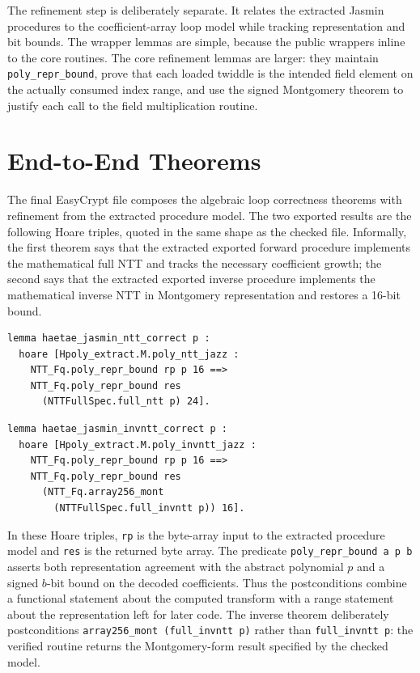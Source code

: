 \documentclass[10pt,twocolumn]{article}
\newcommand{\jasmin}{Jasmin}
\begin{document}
The refinement step is deliberately separate. It relates the extracted
\jasmin{} procedures to the coefficient-array loop model while tracking
representation and bit bounds. The wrapper lemmas are simple, because the
public wrappers inline to the core routines. The core refinement lemmas are
larger: they maintain \texttt{poly\_repr\_bound}, prove that each loaded twiddle
is the intended field element on the actually consumed index range, and use the
signed Montgomery theorem to justify each call to the field multiplication
routine.

\section{End-to-End Theorems}

The final EasyCrypt file  composes the algebraic loop
correctness theorems with refinement from the extracted procedure model. The two
exported results are the following Hoare triples, quoted in the same shape as the
checked file. Informally, the first theorem says that the extracted exported
forward procedure implements the mathematical full NTT and tracks the necessary
coefficient growth; the second says that the extracted exported inverse
procedure implements the mathematical inverse NTT in Montgomery representation
and restores a 16-bit bound.

\begin{lstlisting}
lemma haetae_jasmin_ntt_correct p :
  hoare [Hpoly_extract.M.poly_ntt_jazz :
    NTT_Fq.poly_repr_bound rp p 16 ==>
    NTT_Fq.poly_repr_bound res
      (NTTFullSpec.full_ntt p) 24].
\end{lstlisting}

\begin{lstlisting}
lemma haetae_jasmin_invntt_correct p :
  hoare [Hpoly_extract.M.poly_invntt_jazz :
    NTT_Fq.poly_repr_bound rp p 16 ==>
    NTT_Fq.poly_repr_bound res
      (NTT_Fq.array256_mont
        (NTTFullSpec.full_invntt p)) 16].
\end{lstlisting}

In these Hoare triples, \texttt{rp} is the byte-array input to the extracted
procedure model and \texttt{res} is the returned byte array. The predicate
\texttt{poly\_repr\_bound a p b} asserts both representation agreement with the
abstract polynomial \(p\) and a signed \(b\)-bit bound on the decoded
coefficients. Thus the postconditions combine a functional statement about the
computed transform with a range statement about the representation left for
later code. The inverse theorem deliberately postconditions
\texttt{array256\_mont (full\_invntt p)} rather than \texttt{full\_invntt p}:
the verified routine returns the Montgomery-form result specified by the
checked model.
\end{document}
